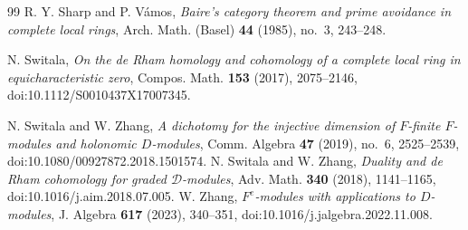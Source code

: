 \documentclass[11pt]{amsart}
\theoremstyle{definition}
\begin{document}
\begin{thebibliography}{99}
R. Y. Sharp and P. V\'amos,
\emph{Baire's category theorem and prime avoidance in complete local rings},
Arch. Math. (Basel) \textbf{44} (1985), no.~3, 243--248.

N. Switala, \emph{On the de Rham homology and cohomology of a complete
local ring in equicharacteristic zero},
Compos. Math. \textbf{153} (2017), 2075--2146,
doi:10.1112/S0010437X17007345.

N. Switala and W. Zhang, \emph{A dichotomy for the injective dimension
of $F$-finite $F$-modules and holonomic $D$-modules},
Comm. Algebra \textbf{47} (2019), no.~6, 2525--2539,
doi:10.1080/00927872.2018.1501574.
N. Switala and W. Zhang,
\emph{Duality and de Rham cohomology for graded $\mathcal{D}$-modules},
Adv. Math. \textbf{340} (2018), 1141--1165,
doi:10.1016/j.aim.2018.07.005.
W. Zhang,
\emph{$F^e$-modules with applications to $D$-modules},
J. Algebra \textbf{617} (2023), 340--351,
doi:10.1016/j.jalgebra.2022.11.008.

\end{thebibliography}
\end{document}
